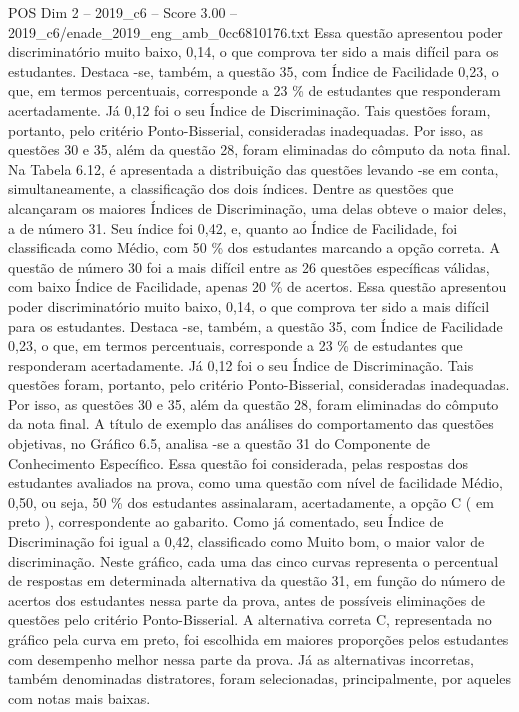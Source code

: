 \begin{textsample}{POS Dim 2 – 2019\_c6 – Score 3.00 – 2019\_c6/enade\_2019\_eng\_amb\_0cc6810176.txt}
Essa questão apresentou poder discriminatório muito baixo, 0,14, o que comprova ter sido a mais difícil para os estudantes.
Destaca -se, também, a questão 35, com Índice de Facilidade 0,23, o que, em termos percentuais, corresponde a 23 \% de estudantes que responderam acertadamente.
Já 0,12 foi o seu Índice de Discriminação.
Tais questões foram, portanto, pelo critério Ponto-Bisserial, consideradas inadequadas.
Por isso, as questões 30 e 35, além da questão 28, foram eliminadas do cômputo da nota final.
Na Tabela 6.12, é apresentada a distribuição das questões levando -se em conta, simultaneamente, a classificação dos dois índices.
Dentre as questões que alcançaram os maiores Índices de Discriminação, uma delas obteve o maior deles, a de número 31.
Seu índice foi 0,42, e, quanto ao Índice de Facilidade, foi classificada como Médio, com 50 \% dos estudantes marcando a opção correta.
A questão de número 30 foi a mais difícil entre as 26 questões específicas válidas, com baixo Índice de Facilidade, apenas 20 \% de acertos.
Essa questão apresentou poder discriminatório muito baixo, 0,14, o que comprova ter sido a mais difícil para os estudantes.
Destaca -se, também, a questão 35, com Índice de Facilidade 0,23, o que, em termos percentuais, corresponde a 23 \% de estudantes que responderam acertadamente.
Já 0,12 foi o seu Índice de Discriminação.
Tais questões foram, portanto, pelo critério Ponto-Bisserial, consideradas inadequadas.
Por isso, as questões 30 e 35, além da questão 28, foram eliminadas do cômputo da nota final.
A título de exemplo das análises do comportamento das questões objetivas, no Gráfico 6.5, analisa -se a questão 31 do Componente de Conhecimento Específico.
Essa questão foi considerada, pelas respostas dos estudantes avaliados na prova, como uma questão com nível de facilidade Médio, 0,50, ou seja, 50 \% dos estudantes assinalaram, acertadamente, a opção C ( em preto ), correspondente ao gabarito.
Como já comentado, seu Índice de Discriminação foi igual a 0,42, classificado como Muito bom, o maior valor de discriminação.
Neste gráfico, cada uma das cinco curvas representa o percentual de respostas em determinada alternativa da questão 31, em função do número de acertos dos estudantes nessa parte da prova, antes de possíveis eliminações de questões pelo critério Ponto-Bisserial.
A alternativa correta C, representada no gráfico pela curva em preto, foi escolhida em maiores proporções pelos estudantes com desempenho melhor nessa parte da prova.
Já as alternativas incorretas, também denominadas distratores, foram selecionadas, principalmente, por aqueles com notas mais baixas.

\end{textsample}
